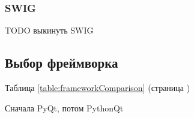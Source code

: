 \documentclass[14pt]{matmex-diploma-custom}
\begin{document}

\subsubsection{SWIG}
TODO выкинуть SWIG

\subsection{Выбор фреймворка}

Таблица \ref{table:frameworkComparison} (страница \pageref{table:frameworkComparison})

Сначала PyQt, потом PythonQt

\end{document}
